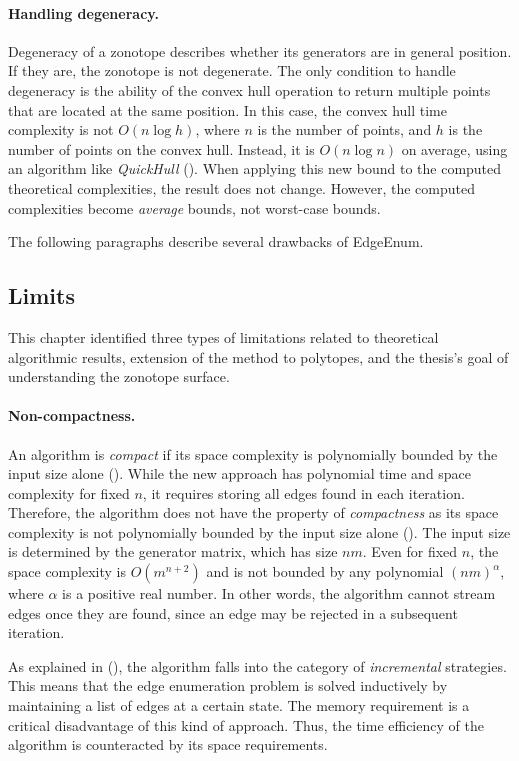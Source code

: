 \paragraph*{Handling degeneracy.} Degeneracy of a zonotope describes whether its generators are in general position. If they are, the zonotope is not degenerate. The only condition to handle degeneracy is the ability of the convex hull operation to return multiple points that are located at the same position. In this case, the convex hull time complexity is not $O(n\log h)$, where $n$ is the number of points, and $h$ is the number of points on the convex hull. Instead, it is $O(n\log n)$ on average, using an algorithm like \emph{QuickHull} (\cite{barberQuickhullAlgorithmConvex1996}). When applying this new bound to the computed theoretical complexities, the result does not change. However, the computed complexities become \emph{average} bounds, not worst-case bounds. 

The following paragraphs describe several drawbacks of EdgeEnum.

\subsection*{Limits}
This chapter identified three types of limitations related to theoretical algorithmic results, extension of the method to polytopes, and the thesis's goal of understanding the zonotope surface.

\paragraph*{Non-compactness.} An algorithm is \emph{compact} if its space complexity is polynomially bounded by the input size alone (\cite{fukudaZonotopeConstructionMinkowski2004a}).
While the new approach has polynomial time and space complexity for fixed $n$, it requires storing all edges found in each iteration. Therefore, the algorithm does not have the property of \emph{compactness} as its space complexity is not polynomially bounded by the input size alone (\cite{fukudaZonotopeConstructionMinkowski2004a}). The input size is determined by the generator matrix, which has size $nm$. Even for fixed $n$, the space complexity is $O(m^{n+2})$ and is not bounded by any polynomial $(nm)^{\alpha}$, where $\alpha$ is a positive real number. In other words, the algorithm cannot stream edges once they are found, since an edge may be rejected in a subsequent iteration.

As explained in (\cite{ferrezSolvingFixedRank2005a}), the algorithm falls into the category of \emph{incremental} strategies. This means that the edge enumeration problem is solved inductively by maintaining a list of edges at a certain state. The memory requirement is a critical disadvantage of this kind of approach. Thus, the time efficiency of the algorithm is counteracted by its space requirements.

